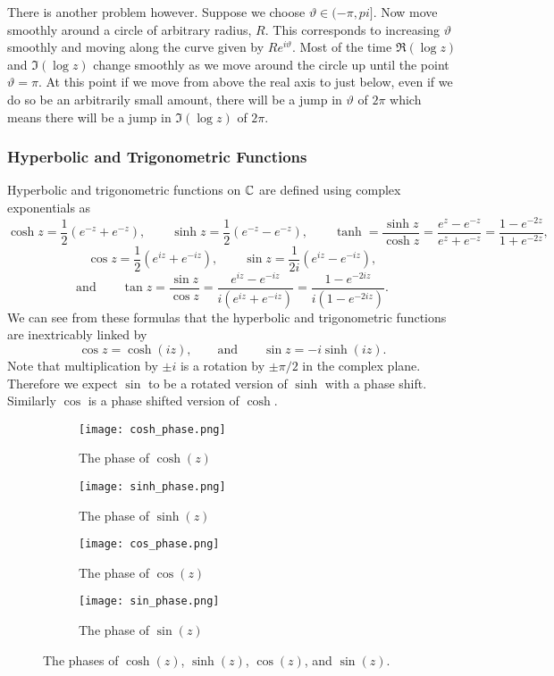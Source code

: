 \documentclass{article}
\begin{document}
    There is another problem however.
    Suppose we choose \(\vartheta \in (-\pi, pi]\).
    Now move smoothly around a circle of arbitrary radius, \(R\).
    This corresponds to increasing \(\vartheta\) smoothly and moving along the curve given by \(Re^{i\vartheta}\).
    Most of the time \(\Re(\log z)\) and \(\Im(\log z)\) change smoothly as we move around the circle up until the point \(\vartheta = \pi\).
    At this point if we move from above the real axis to just below, even if we do so be an arbitrarily small amount, there will be a jump in \(\vartheta\) of \(2\pi\) which means there will be a jump in \(\Im(\log z)\) of \(2\pi\).
    
    \subsubsection{Hyperbolic and Trigonometric Functions}
    Hyperbolic and trigonometric functions on \(\mathbb{C}\) are defined using complex exponentials as
    \[\cosh z = \frac{1}{2}(e^{-z} + e^{-z}), \qquad \sinh z = \frac{1}{2}(e^{-z} - e^{-z}), \qquad \tanh = \frac{\sinh z}{\cosh z} = \frac{e^{z} - e^{-z}}{e^{z} + e^{-z}} = \frac{1 - e^{-2z}}{1 + e^{-2z}},\]
    \[\cos z = \frac{1}{2}(e^{iz} + e^{-iz}), \qquad \sin z = \frac{1}{2i}(e^{iz} - e^{-iz}),\]
    \[\text{and}\qquad \tan z = \frac{\sin z}{\cos z} = \frac{e^{iz} - e^{-iz}}{i(e^{iz} + e^{-iz})} = \frac{1 - e^{-2iz}}{i(1 - e^{-2iz})}.\]
    We can see from these formulas that the hyperbolic and trigonometric functions are inextricably linked by
    \[\cos z = \cosh(iz), \qquad\text{and}\qquad \sin z = -i\sinh(iz).\]
    Note that multiplication by \(\pm i\) is a rotation by \(\pm\pi/2\) in the complex plane.
    Therefore we expect \(\sin\) to be a rotated version of \(\sinh\) with a phase shift.
    Similarly \(\cos\) is a phase shifted version of \(\cosh\).
    \begin{figure}[ht]
        \centering
        \begin{subfigure}{0.45\textwidth}
            \centering
            \texttt{[image: cosh\_phase.png]}
            \caption{The phase of \(\cosh(z)\)}
        \end{subfigure}
        \begin{subfigure}{0.45\textwidth}
            \centering
            \texttt{[image: sinh\_phase.png]}
            \caption{The phase of \(\sinh(z)\)}
        \end{subfigure}
        \begin{subfigure}{0.45\textwidth}
            \centering
            \texttt{[image: cos\_phase.png]}
            \caption{The phase of \(\cos(z)\)}
        \end{subfigure}
        \begin{subfigure}{0.45\textwidth}
            \centering
            \texttt{[image: sin\_phase.png]}
            \caption{The phase of \(\sin(z)\)}
        \end{subfigure}
        \caption{The phases of \(\cosh(z)\), \(\sinh(z)\), \(\cos(z)\), and \(\sin(z)\).}
    \end{figure}
\end{document}
